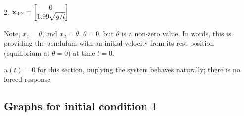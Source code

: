 \documentclass[10pt]{article}
\begin{document}
\begin{center}
    2. 
    \begin{math}
     \mathbf{x}_{0,2} =  \begin{bmatrix} 0\\1.99 \sqrt{g/l} \end{bmatrix}
    \end{math}
\end{center}

Note, $x_1 = \theta$, and $x_2 = \dot{\theta}$. 
$\theta = 0$, but $\dot{\theta}$ is a non-zero value. In words, this is providing the pendulum with an initial velocity from its rest position (equilibrium at $\theta = 0$) at time $t = 0$.

$u(t) = 0$ for this section, implying the system behaves naturally; there is no forced response.

\subsection{Graphs for initial condition 1}
\end{document}
